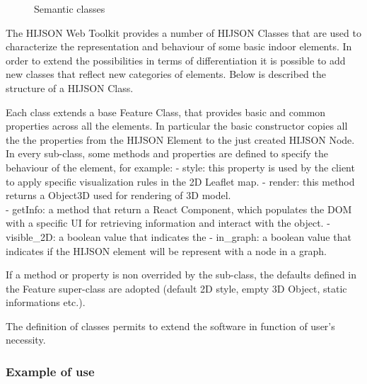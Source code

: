 \documentclass{sig-alternate}
\begin{document}
\begin{figure}
\centering
{}
\caption{Semantic classes}
\label{fig:semantic-classes}
\end{figure}

The HIJSON Web Toolkit provides a number of HIJSON Classes that are used
to characterize the representation and behaviour of some basic indoor
elements. In order to extend the possibilities in terms of
differentiation it is possible to add new classes that reflect new
categories of elements. Below is described the structure of a HIJSON
Class.

Each class extends a base Feature Class, that provides basic and common
properties across all the elements. In particular the basic constructor
copies all the the properties from the HIJSON Element to the just
created HIJSON Node. In every sub-class, some methods and properties are
defined to specify the behaviour of the element, for example: - style:
this property is used by the client to apply specific visualization
rules in the 2D Leaflet map. - render: this method returns a Object3D
used for rendering of 3D model.\\- getInfo: a method that return a React
Component, which populates the DOM with a specific UI for retrieving
information and interact with the object. - visible\_2D: a boolean value
that indicates the - in\_graph: a boolean value that indicates if the
HIJSON element will be represent with a node in a graph.

If a method or property is non overrided by the sub-class, the defaults
defined in the Feature super-class are adopted (default 2D style, empty
3D Object, static informations etc.).

The definition of classes permits to extend the software in function of
user's necessity.

\subsubsection{Example of use}\label{example-of-use}
\end{document}
